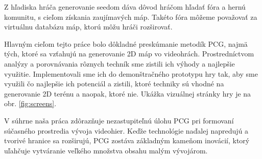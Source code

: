 Z hľadiska hráča generovanie seedom dáva dôvod hráčom hľadať fóra a hernú komunitu, s cieľom získania zaujímavých máp. Takéto fóra môžeme považovať za virtuálnu databázu máp, ktorú môžu hráči rozširovať.

Hlavným cieľom tejto práce bolo dôkladné preskúmanie metodík PCG, najmä tých, ktoré sa vzťahujú na generovanie 2D máp vo videohrách. Prostredníctvom analýzy a porovnávania rôznych techník sme zistili ich výhody a najlepšie využitie. Implementovali sme ich do demonštračného prototypu hry tak, aby sme využili čo najlepšie ich potenciál a zistili, ktoré techniky sú vhodné na generovanie 2D terénu a naopak, ktoré nie. Ukážka vizuálnej stránky hry je na obr. \ref{fig:screens}. 

V súhrne naša práca zdôrazňuje nezastupiteľnú úlohu PCG pri formovaní súčasného prostredia vývoja videohier. Keďže technológie naďalej napredujú a tvorivé hranice sa rozširujú, PCG zostáva základným kameňom inovácií, ktorý uľahčuje vytváranie veľkého množstva obsahu malým vývojárom.